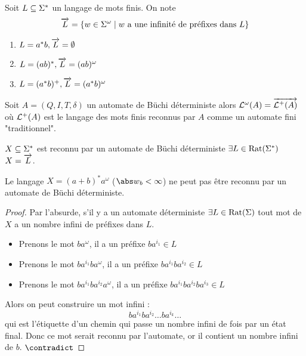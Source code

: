 \begin{definition}
	Soit $L \subseteq \Sigma^{*}$ un langage de mots finis. On note
	$$\overrightarrow{L} = \left\{w \in \Sigma^ {\omega} \mid w \text{ a une infinité de préfixes dans } L\right\}$$
\end{definition}


\begin{exemple}
	\begin{enumerate}
		\item $L = a^*b, \overrightarrow{L} = \emptyset$
		\item $L = (ab)^*, \overrightarrow{L} = (ab)^{\omega}$
		\item $L = (a^*b)^+, \overrightarrow{L} =  (a^*b)^{\omega}$
	\end{enumerate}
\end{exemple}


\begin{prop}[Admis]
	Soit $A = (Q,I,T,\delta)$ un automate de Büchi déterministe alors $\mathcal{L}^{\omega} (A) = \overrightarrow{\mathcal{L}^+ (A)}$
	où $\mathcal{L}^+ (A)$ est le langage des mots finis reconnus par $A$ comme un automate fini "traditionnel".
\end{prop}


\begin{coro}
	$X \subseteq \Sigma^{*}$ est reconnu par un automate de Büchi déterministe \ssi $\exists L \in \text{Rat}(\Sigma^{*})$
	\tq $X = \overrightarrow{L}$.
\end{coro}

\begin{prop}
	Le langage $X = (a+b)^*a^{\omega}$ ($ {\abs w}_b < \infty $) ne peut pas être reconnu par un automate de Büchi déterministe.
\end{prop}

\begin{proof}
	Par l'absurde, s'il y a un automate déterministe $\exists  L \in \text{Rat}(\Sigma)$ \tq tout mot de $X$ a un nombre infini de préfixes dans $L$.

	\begin{itemize}
		\item Prenons le mot $ba^{\omega}$, il a un préfixe $ba^{i_1} \in L$
		\item Prenons le mot $ba^{i_1}ba^{\omega}$, il a un préfixe $ba^{i_1}ba^{i_2} \in L$
		\item Prenons le mot $ba^{i_1}ba^{i_2}a^{\omega}$, il a un préfixe $ba^{i_1}ba^{i_2}ba^{i_3} \in L$
	\end{itemize}

	Alors on peut construire un mot infini :
	$$ ba^{i_1}ba^{i_2}\ldots ba^{i_k}\ldots$$
	qui est l'étiquette d'un chemin qui passe un nombre infini de fois par un état final.
	Donc ce mot serait reconnu par l'automate, or il contient un nombre infini de $b$.  $\contradict$
\end{proof}
